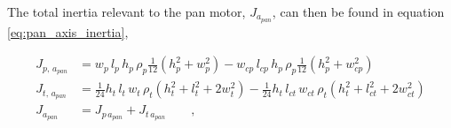 \documentclass[../../main.tex]{subfiles}
\begin{document}


The total inertia relevant to the pan motor, $J_{a_{pan}}$, can then be found in equation \ref{eq:pan_axis_inertia}, 

\begin{equation}\label{eq:pan_axis_inertia}
\begin{split}
        J_{p,\,a_{pan}} &= w_{p}\,l_{p}\,h_{p}\,\rho_{p}\frac{1}{12}(h_{p}^2+w_{p}^2)-w_{cp}\,l_{cp}\,h_{p}\,\rho_{p}\frac{1}{12}(h_{p}^2+w_{cp}^2) \\
        J_{t,\,a_{pan}} &= \frac{1}{24}h_t\,l_t\,w_t\, \rho_t (h_t^2+l_t^2+2w_t^2)-\frac{1}{24}h_t\,l_{ct}\,w_{ct}\, \rho_t (h_t^2+l_{ct}^2+2w_{ct}^2)
        \\
        J_{a_{pan}} &= J_{p\,a_{pan}} + J_{t\,a_{pan}} \qquad ,
\end{split}
\end{equation}
\end{document}
